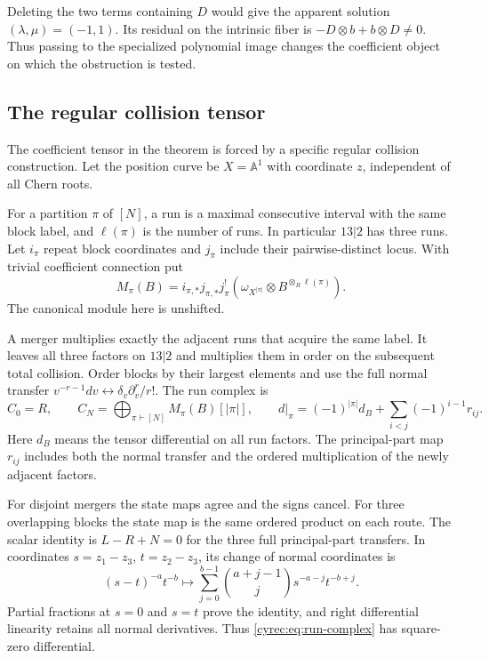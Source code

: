 Deleting the two terms containing $D$ would give the apparent
solution $(\lambda,\mu)=(-1,1)$. Its residual on the intrinsic
fiber is $-D\otimes b+b\otimes D\ne0$.
Thus passing to the specialized polynomial image changes the
coefficient object on which the obstruction is tested.

\subsection{The regular collision tensor}

The coefficient tensor in the theorem is forced by a specific
regular collision construction. Let the position curve be
$X=\mathbb A^1$ with coordinate $z$, independent of all Chern
roots.

For a partition $\pi$ of $[N]$, a run is a maximal
consecutive interval with the same block label, and $\ell(\pi)$
is the number of runs. In particular $13|2$ has three runs.
Let $i_\pi$ repeat block coordinates and $j_\pi$ include their
pairwise-distinct locus. With trivial coefficient connection put
\[
 M_\pi(B)=i_{\pi,*}j_{\pi,*}j_\pi^!
            (\omega_{X^{|\pi|}}\otimes B^{\otimes_R\ell(\pi)}).
\]
The canonical module here is unshifted.

A merger multiplies exactly the adjacent runs that acquire the
same label. It leaves all three factors on $13|2$ and multiplies
them in order on the subsequent total collision.
Order blocks by their largest elements and use the full normal
transfer $v^{-r-1}dv\leftrightarrow\delta_v\partial_v^r/r!$.
The run complex is
\begin{equation}\label{cyrec:eq:run-complex}
 C_0=R,\qquad C_N=\bigoplus_{\pi\vdash[N]}M_\pi(B)[|\pi|],
 \qquad
 d|_\pi=(-1)^{|\pi|}d_B+\sum_{i<j}(-1)^{i-1}r_{ij}.
\end{equation}
Here $d_B$ means the tensor differential on all run factors.
The principal-part map $r_{ij}$ includes both the normal transfer
and the ordered multiplication of the newly adjacent factors.

For disjoint mergers the state maps agree and the signs cancel.
For three overlapping blocks the state map is the same ordered
product on each route. The scalar identity is $L-R+N=0$ for
the three full principal-part transfers. In coordinates
$s=z_1-z_3$, $t=z_2-z_3$, its change of normal coordinates is
\[
 (s-t)^{-a}t^{-b}\longmapsto
     \sum_{j=0}^{b-1}\binom{a+j-1}{j}s^{-a-j}t^{-b+j}.
\]
Partial fractions at $s=0$ and $s=t$ prove the identity, and
right differential linearity retains all normal derivatives.
Thus \eqref{cyrec:eq:run-complex} has square-zero differential.

